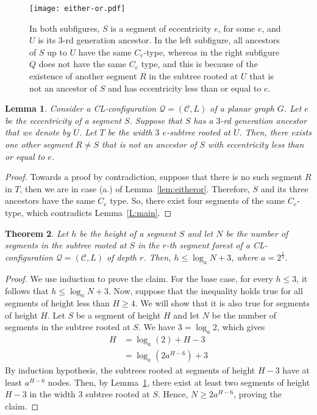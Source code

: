 \documentclass{article}
\newcommand{\hconstant}{3}
\newtheorem{theorem}{Theorem}
\newtheorem{lemma}[theorem]{Lemma}
\numberwithin{claimcounter}{lemma}
\begin{document}
\begin{figure}[!htb]
    \centering
    \texttt{[image: either-or.pdf]}
    \caption{In both subfigures, $S$ is a segment of eccentricity $e$, for some $e$, and $U$ is its $3$-rd generation ancestor. In the left subfigure, all ancestors of $S$ up to $U$ have the same $C_e$-type, whereas in the right subfigure $Q$ does not have the same $C_e$ type, and this is because of the existence of another segment $R$ in the subtree rooted at $U$ that is not an ancestor of $S$ and has eccentricity less than or equal to $e$.}
    \label{fig:either-or}
\end{figure}

\begin{lemma} \label{lem:atleasttwo}
    Consider a CL-configuration $\mathcal{Q}=(\mathcal{C},L)$ of a planar graph $G$. Let $e$ be the eccentricity of a segment $S$. Suppose that $S$ has a $3$-rd  generation ancestor that we denote by $U$. Let $T$ be the width $3$ $e$-subtree rooted at $U$. Then, there exists one other segment  $R \neq S$ that is not an ancestor of $S$ with eccentricity less than or equal to $e$.
\end{lemma}
\begin{proof}
    Towards a proof by contradiction, suppose that there is no such segment $R$ in $T$, then we are in case (a.) of Lemma~\ref{lem:eitheror}. Therefore, $S$ and its three ancestors have the same $C_e$ type. So, there exist four segments of the same $C_e$-type, which contradicts Lemma~\ref{L:main}.  
\end{proof}
    
\begin{theorem} \label{thm:logarithmic}
    Let $h$ be the height of a segment $S$ and let $N$ be the number of segments in the subtree rooted at $S$  in the $r$-th segment forest of a  CL-configuration $\mathcal{Q}=(\mathcal{C},L)$ of depth $r$. Then, $h \leq \log_a N + \hconstant$, where $a = 2^{\frac{1}{\hconstant}}$. 
\end{theorem}
\begin{proof}
        We use induction to prove the claim. For the base case, for every $h \leq \hconstant$, it follows that $h \leq \log_a N + \hconstant$. Now, suppose that the inequality holds true for all segments of height less than $H \geq 4$. We will show that it is also true for segments of height $H$. 
        Let $S$ be a segment of height $H$ and let $N$ be the number of segments in the subtree rooted at $S$. 
        We have $\hconstant = \log_a 2$, which gives 
        \begin{align*}
        H &= \log_a(2) + H - \hconstant \\
          &= \log_a(2 a^{H-6}) + \hconstant 
        \end{align*} 
By induction hypothesis, the subtrees rooted at segments of height $H-\hconstant$ have at least $a^{H-6}$ nodes. Then, by Lemma~\ref{lem:atleasttwo}, there exist at least two segments of height $H-\hconstant$ in the width $\hconstant$ subtree rooted at $S$. Hence, $N \geq 2 a^{H-6}$, proving the claim.
\end{proof}
\end{document}
